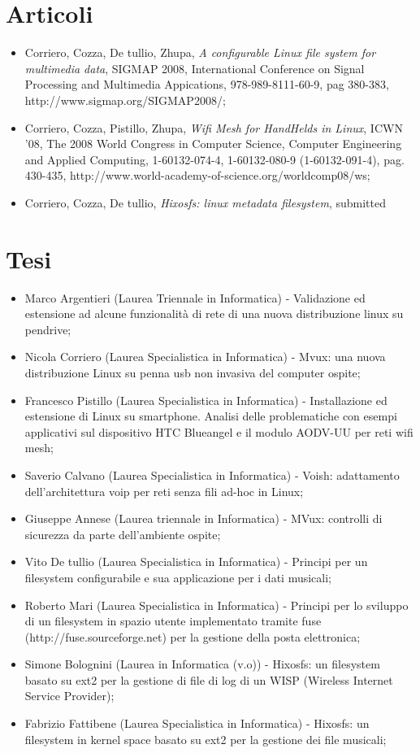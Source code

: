 \documentclass[a4paper,12pt]{article}
\renewcommand{\aa }{\`{a} }
\begin{document}
\section*{Articoli}
\begin{itemize}
\item Corriero, Cozza, De tullio, Zhupa, \textit{A configurable Linux file system for multimedia data}, SIGMAP 2008, International Conference on Signal Processing and Multimedia Appications, 978-989-8111-60-9, pag 380-383, \\http://www.sigmap.org/SIGMAP2008/;
\item Corriero, Cozza, Pistillo, Zhupa, \textit{Wifi Mesh for HandHelds in Linux}, ICWN '08, The 2008 World Congress in Computer Science, Computer Engineering and Applied Computing, 1-60132-074-4, 1-60132-080-9 (1-60132-091-4), pag. 430-435, http://www.world-academy-of-science.org/worldcomp08/ws;
\item Corriero, Cozza, De tullio, \textit{Hixosfs: linux metadata filesystem}, submitted
\end{itemize}


\section*{Tesi}
\begin{itemize}
\item Marco Argentieri (Laurea Triennale in Informatica) - Validazione ed estensione ad alcune funzionalit\aa di rete di una nuova distribuzione linux su pendrive;
\item Nicola Corriero (Laurea Specialistica in Informatica) - Mvux: una nuova distribuzione Linux su penna usb non invasiva del computer ospite;
\item Francesco Pistillo (Laurea Specialistica in Informatica) - Installazione ed estensione di Linux su smartphone. Analisi delle problematiche con esempi applicativi sul dispositivo HTC Blueangel e il modulo AODV-UU per reti wifi mesh;
\item Saverio Calvano (Laurea Specialistica in Informatica) - Voish: adattamento dell'architettura voip per reti senza fili ad-hoc in Linux;
 \item Giuseppe Annese (Laurea triennale in Informatica) - MVux: controlli di sicurezza da parte dell'ambiente ospite;
\item Vito De tullio (Laurea Specialistica in Informatica) - Principi per un filesystem configurabile e sua applicazione per i dati musicali;
\item Roberto Mari (Laurea Specialistica in Informatica) - Principi per lo sviluppo di un filesystem in spazio utente implementato tramite fuse \\(http://fuse.sourceforge.net) per la gestione della posta elettronica;
\item Simone Bolognini (Laurea in Informatica  (v.o)) - Hixosfs: un filesystem basato su ext2 per la gestione di file di log di un WISP (Wireless Internet Service Provider);
\item Fabrizio Fattibene (Laurea Specialistica in Informatica) - Hixosfs: un filesystem in kernel space basato su ext2 per la gestione dei file musicali;
\end{itemize}
\end{document}
